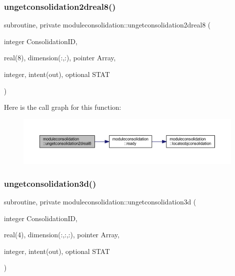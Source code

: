 \subsubsection{\texorpdfstring{ungetconsolidation2dreal8()}{ungetconsolidation2dreal8()}}
{\footnotesize\ttfamily subroutine, private moduleconsolidation\+::ungetconsolidation2dreal8 (\begin{DoxyParamCaption}\item[{integer}]{Consolidation\+ID,  }\item[{real(8), dimension(\+:,\+:), pointer}]{Array,  }\item[{integer, intent(out), optional}]{S\+T\+AT }\end{DoxyParamCaption})\hspace{0.3cm}{\ttfamily [private]}}

Here is the call graph for this function\+:\nopagebreak
\begin{figure}[H]
\begin{center}
\leavevmode
\includegraphics[width=350pt]{namespacemoduleconsolidation_a72d92545dc323c3374c46a863489ab61_cgraph}
\end{center}
\end{figure}
\mbox{\label{namespacemoduleconsolidation_affeed262d558e9c88366602767505b07}} 
\subsubsection{\texorpdfstring{ungetconsolidation3d()}{ungetconsolidation3d()}}
{\footnotesize\ttfamily subroutine, private moduleconsolidation\+::ungetconsolidation3d (\begin{DoxyParamCaption}\item[{integer}]{Consolidation\+ID,  }\item[{real(4), dimension(\+:,\+:,\+:), pointer}]{Array,  }\item[{integer, intent(out), optional}]{S\+T\+AT }\end{DoxyParamCaption})\hspace{0.3cm}{\ttfamily [private]}}

